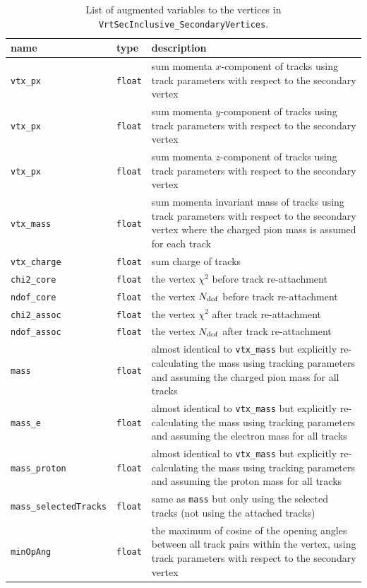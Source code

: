 \documentclass[NOTE, atlasdraft=true, texlive=2018, UKenglish]{\ATLASLATEXPATH atlasdoc}
\begin{document}
\begin{table}[htbp]
\caption{List of augmented variables to the vertices in {\tt VrtSecInclusive\_SecondaryVertices}.}
\centering
\scriptsize
\begin{tabular}{llp{10cm}}
\hline
\hline
name & type & description\\
\hline
{\tt vtx\_px} & {\tt float} & sum momenta $x$-component of tracks using track parameters with respect to the secondary vertex\\
{\tt vtx\_px} & {\tt float} & sum momenta $y$-component of tracks using track parameters with respect to the secondary vertex\\
{\tt vtx\_px} & {\tt float} & sum momenta $z$-component of tracks using track parameters with respect to the secondary vertex\\
{\tt vtx\_mass} & {\tt float} & sum momenta invariant mass of tracks using track parameters with respect to the secondary vertex where the charged pion mass is assumed for each track\\
{\tt vtx\_charge} & {\tt float} & sum charge of tracks\\
{\tt chi2\_core} & {\tt float} & the vertex $\chi^{2}$ before track re-attachment\\
{\tt ndof\_core} & {\tt float} & the vertex $N_{\rm dof}$ before track re-attachment\\
{\tt chi2\_assoc} & {\tt float} & the vertex $\chi^{2}$ after track re-attachment\\
{\tt ndof\_assoc} & {\tt float} & the vertex $N_{\rm dof}$ after track re-attachment\\
{\tt mass} & {\tt float} & almost identical to {\tt vtx\_mass} but explicitly re-calculating the mass using tracking parameters and assuming the charged pion mass for all tracks\\
{\tt mass\_e} & {\tt float} & almost identical to {\tt vtx\_mass} but explicitly re-calculating the mass using tracking parameters and assuming the electron mass for all tracks\\
{\tt mass\_proton} & {\tt float} & almost identical to {\tt vtx\_mass} but explicitly re-calculating the mass using tracking parameters and assuming the proton mass for all tracks\\
{\tt mass\_selectedTracks} & {\tt float} & same as {\tt mass} but only using the selected tracks (not using the attached tracks)\\
{\tt minOpAng} & {\tt float} & the maximum of cosine of the opening angles between all track pairs within the vertex, using track parameters with respect to the secondary vertex\\

\end{tabular}
\end{table}
\end{document}
